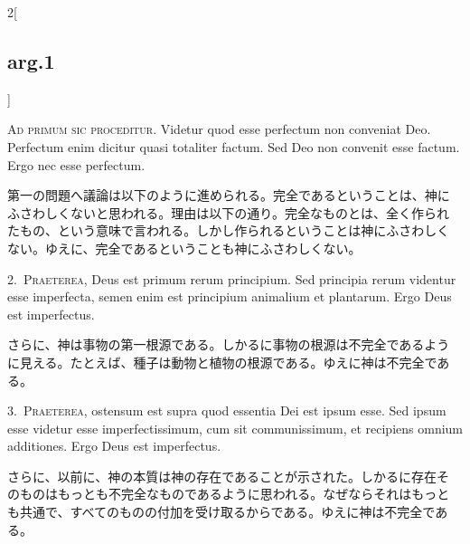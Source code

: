 \documentclass[paper=a4paper,fontsize=10pt,jafontsize=9pt,titlepage]{jlreq}
\begin{document}
\begin{paracol}{2}[\subsection{arg.1}]

{\huge A}{\scshape d primum sic proceditur}. Videtur quod esse
 perfectum non conveniat Deo. Perfectum enim dicitur quasi totaliter
 factum. Sed Deo non convenit esse factum. Ergo nec esse perfectum.

\switchcolumn

第一の問題へ議論は以下のように進められる。完全であるということは、神に
ふさわしくないと思われる。理由は以下の通り。完全なものとは、全く作られ
たもの、という意味で言われる。しかし作られるということは神にふさわしく
ない。ゆえに、完全であるということも神にふさわしくない。


2.~{\scshape Praeterea}, Deus est primum rerum principium. Sed
principia rerum videntur esse imperfecta, semen enim est principium
animalium et plantarum. Ergo Deus est imperfectus.

\switchcolumn

さらに、神は事物の第一根源である。しかるに事物の根源は不完全であるよう
に見える。たとえば、種子は動物と植物の根源である。ゆえに神は不完全であ
る。


3.~{\scshape Praeterea}, ostensum est supra quod essentia Dei est
ipsum esse. Sed ipsum esse videtur esse imperfectissimum, cum sit
communissimum, et recipiens omnium additiones. Ergo Deus est
imperfectus.

\switchcolumn

さらに、以前に、神の本質は神の存在であることが示された。しかるに存在そ
のものはもっとも不完全なものであるように思われる。なぜならそれはもっと
も共通で、すべてのものの付加を受け取るからである。ゆえに神は不完全であ
る。

\switchcolumn*[\subsection{s.c.}]


\end{paracol}
\end{document}
